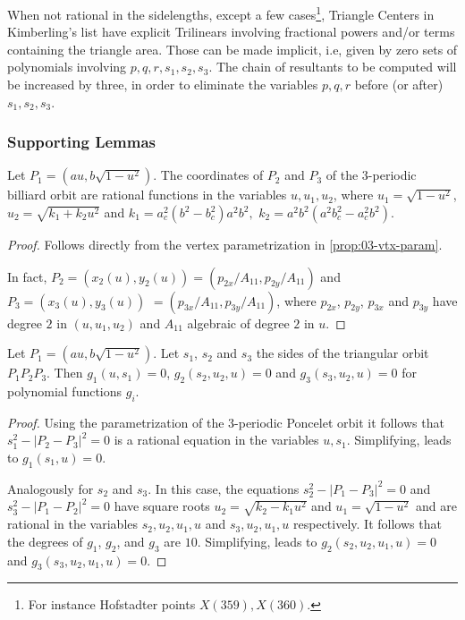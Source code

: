 When not rational in the sidelengths, except a few cases\footnote{For instance Hofstadter points $X(359), X(360)$.}, Triangle Centers
in Kimberling's list have explicit Trilinears involving fractional powers and/or terms containing the triangle area. Those can be made implicit, i.e,
given by zero sets of polynomials involving $p,q,r, s_1, s_2, s_3$.  The chain of resultants to be computed will be increased by three, in order to eliminate the variables $p,q, r$ before (or after) $s_1, s_2, s_3$.

\subsubsection{Supporting Lemmas}
\label{sec:supporting-lemmas}

\begin{lemma}
\label{lem:1coord}
Let $P_1=({a}{u},b\sqrt{1-u^2}).$
	The coordinates of $P_2$ and $P_3$ of the 3-periodic billiard orbit are rational functions in the variables $u, u_1, u_2$, where
	$u_1=\sqrt{1-u^2}$, $u_2=\sqrt{k_1+k_2 u^2}$ 
and
	$k_1= a_c^2(b^2 - b_c^2)a^2b^2,$ $ k_2= a^2b^2(a^2b_c^2 - a_c^2b^2)$.  
		
	\end{lemma}
	
	\begin{proof}
	Follows directly from the vertex parametrization in \cref{prop:03-vtx-param}.
 
	In fact,  $P_2=(x_2(u),y_2(u)) =( p_{2x}/A_{11}, p_{2y}/A_{11})$ and $P_3=(x_3(u),y_3(u))$ $=( p_{3x}/A_{11}, p_{3y}/A_{11})$, where $p_{2x}$, $p_{2y}$, $p_{3x}$ and $p_{3y}$ have degree $2$ in $(u,u_1,u_2)$  and $A_{11}$ algebraic of degree $2$ in $u$. 
\end{proof}
	
\begin{lemma}
\label{lem:2sides} Let $P_1=(a u,b\sqrt{1-u^2}).$ Let $s_1$, $s_2$ and $s_3$ the sides of the triangular orbit ${P_1}{P_2}{P_3}$. Then $g_1(u,s_1)=0$, $g_2(s_2,u_2,u)=0$ and $g_3(s_3,u_2,u)=0$ for polynomial functions $g_i$.  
\end{lemma}
	
\begin{proof}
Using the parametrization of the 3-periodic Poncelet orbit it follows that $s_1^2-|P_2-P_3|^2=0$ is a rational equation in the variables $u,s_1$. Simplifying, leads to $g_1(s_1,u)=0.$

Analogously for $s_2$ and $s_3$. In this case, the equations $s_2^2-|P_1-P_3|^2=0$ and  $s_3^2-|P_1-P_2|^2=0$   have   square roots $u_2=\sqrt{k_2-k_1 u^2}$ and $u_1=\sqrt{1-u^2}$ and  are rational in the variables $s_2,u_2,u_1,u$ and $s_3,u_2,u_1,u$ respectively. It follows that the degrees of $g_1$, $g_2$, and $g_3$ are $10$.  Simplifying, leads to $g_2(s_2,u_2,u_1,u)=0 $ and $g_3(s_3,u_2,u_1,u)=0$. 
\end{proof}


